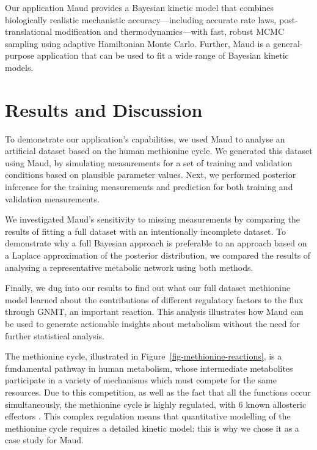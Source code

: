 \documentclass[journal=asbcd6,manuscript=article,layout=traditional]{achemso}
\begin{document}
Our application Maud provides a Bayesian kinetic model that combines
biologically realistic mechanistic accuracy---including accurate rate
laws, post- translational modification and thermodynamics---with fast,
robust MCMC sampling using adaptive Hamiltonian Monte Carlo. Further,
Maud is a general-purpose application that can be used to fit a wide
range of Bayesian kinetic models.

\hypertarget{results-and-discussion}{%
\section{Results and Discussion}\label{results-and-discussion}}

To demonstrate our application's capabilities, we used Maud to analyse
an artificial dataset based on the human methionine cycle. We generated
this dataset using Maud, by simulating measurements for a set of
training and validation conditions based on plausible parameter values.
Next, we performed posterior inference for the training measurements and
prediction for both training and validation measurements.

We investigated Maud's sensitivity to missing measurements by comparing
the results of fitting a full dataset with an intentionally incomplete
dataset. To demonstrate why a full Bayesian approach is preferable to an
approach based on a Laplace approximation of the posterior distribution,
we compared the results of analysing a representative metabolic network
using both methods.

Finally, we dug into our results to find out what our full dataset
methionine model learned about the contributions of different regulatory
factors to the flux through GNMT, an important reaction. This analysis
illustrates how Maud can be used to generate actionable insights about
metabolism without the need for further statistical analysis.

The methionine cycle, illustrated in
Figure~\ref{fig-methionine-reactions}, is a fundamental pathway in human
metabolism, whose intermediate metabolites participate in a variety of
mechanisms which must compete for the same resources. Due to this
competition, as well as the fact that all the functions occur
simultaneously, the methionine cycle is highly regulated, with 6 known
allosteric effectors
\citep{martinov2000, nijhout2006, korendyaseva_allosteric_2008}. This
complex regulation means that quantitative modelling of the methionine
cycle requires a detailed kinetic model: this is why we chose it as a
case study for Maud.
\end{document}
